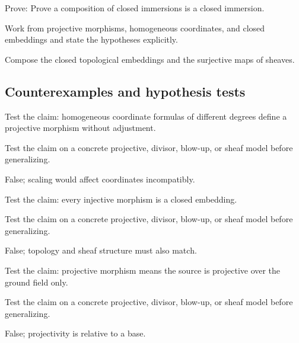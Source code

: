 \begin{exercise}[Composition]\label{exr:vi38-expand-09}
Prove: Prove a composition of closed immersions is a closed immersion.
\end{exercise}
\begin{hint}
Work from projective morphisms, homogeneous coordinates, and closed embeddings and state the hypotheses explicitly.
\end{hint}
\begin{solution}
Compose the closed topological embeddings and the surjective maps of sheaves.
\end{solution}

\subsection*{Counterexamples and hypothesis tests}

\begin{exercise}\label{exr:vi38-expand-10}
Test the claim: homogeneous coordinate formulas of different degrees define a projective morphism without adjustment.
\end{exercise}
\begin{hint}
Test the claim on a concrete projective, divisor, blow-up, or sheaf model before generalizing.
\end{hint}
\begin{solution}
False; scaling would affect coordinates incompatibly.
\end{solution}

\begin{exercise}\label{exr:vi38-expand-11}
Test the claim: every injective morphism is a closed embedding.
\end{exercise}
\begin{hint}
Test the claim on a concrete projective, divisor, blow-up, or sheaf model before generalizing.
\end{hint}
\begin{solution}
False; topology and sheaf structure must also match.
\end{solution}

\begin{exercise}\label{exr:vi38-expand-12}
Test the claim: projective morphism means the source is projective over the ground field only.
\end{exercise}
\begin{hint}
Test the claim on a concrete projective, divisor, blow-up, or sheaf model before generalizing.
\end{hint}
\begin{solution}
False; projectivity is relative to a base.
\end{solution}

